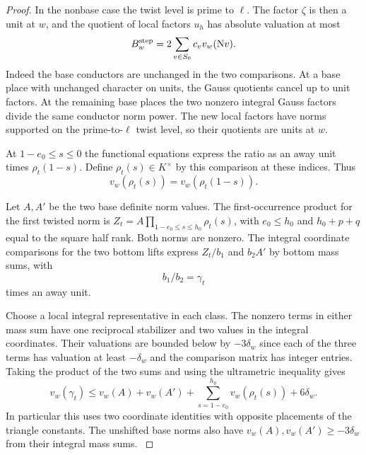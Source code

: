 \begin{proof}
In the nonbase case the
twist level is prime to \(\ell\). The factor \(\zeta\)
is then a unit at \(w\), and the quotient of local factors
\(u_h\) has absolute valuation at most
\[
 B_w^{\rm step}=2\sum_{v\in S_0} c_v v_w(\mathrm Nv).
\]
Indeed the base conductors are unchanged in the two
comparisons. At a base place with unchanged character on
units, the Gauss quotients cancel up to unit factors. At
the remaining base places the two nonzero integral Gauss
factors divide the same conductor norm power. The new local
factors have norms supported on the prime-to-\(\ell\)
twist level, so their quotients are units at \(w\).

At \(1-e_0\le s\le0\) the functional equations express the
ratio as an away unit times \(\rho_t(1-s)\). Define
\(\rho_t(s)\in K^\times\) by this comparison at these indices.
Thus 
\[
  v_w(\rho_t(s))=v_w(\rho_t(1-s)).
\]


Let \(A,A'\) be the two base definite norm values.
The first-occurrence product for the first twisted norm is
\(Z_t=A\prod_{1-e_0\le s\le h_0}\rho_t(s)\), with
\(e_0\le h_0\) and \(h_0+p+q\) equal to the square half rank.
Both norms are nonzero. The integral coordinate comparisons
for the two bottom lifts express \(Z_t/b_1\) and \(b_2A'\)
by bottom mass sums, with 
\[
  b_1/b_2=\gamma_t
\]
 times an
away unit.

Choose a local integral representative in each
class. The nonzero terms in either mass sum have one reciprocal
stabilizer and two values in the integral coordinates. Their valuations
are bounded below by \(-3\delta_w\) since each of the three
terms has valuation at least \(-\delta_w\) and the comparison
matrix has integer entries. Taking the product of the two sums
and using the ultrametric inequality gives
\begin{equation}\label{eq:fitted-square-bottom}
 v_w(\gamma_t)\le v_w(A)+v_w(A')+
             \sum_{s=1-e_0}^{h_0} v_w(\rho_t(s))+6\delta_w .
\end{equation}
In particular this uses two coordinate identities with opposite
placements of the triangle constants. The unshifted base
norms also have \(v_w(A),v_w(A')\ge-3\delta_w\) from their
integral mass sums. \label{cor:fitted-square-ratios-3}

\end{proof}

